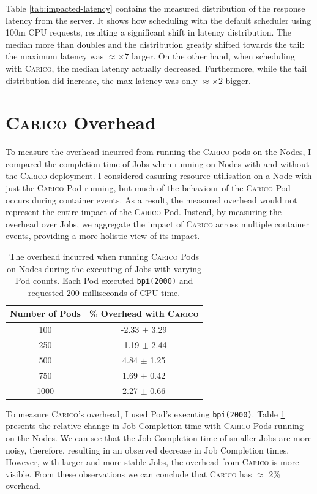 Table \ref{tab:impacted-latency} contains the measured distribution of the
response latency from the server. It shows how scheduling with the default
scheduler using 100m CPU requests, resulting a significant shift in latency
distribution. The median more than doubles and the distribution greatly shifted
towards the tail: the maximum latency was $\approx \times7$ larger. On the other
hand, when scheduling with \textsc{Carico}, the median latency actually decreased.
Furthermore, while the tail distribution did increase, the max latency was only
$\approx \times2$ bigger.

\section{\textsc{Carico} Overhead}
\label{sec:eval-overhead}
To measure the overhead incurred from running the \textsc{Carico} pods on the Nodes, I
compared the completion time of Jobs when running on Nodes with and without the
\textsc{Carico} deployment. I considered easuring resource utilisation on a Node with
just the \textsc{Carico} Pod running, but much of the behaviour of the
\textsc{Carico} Pod occurs during container events. As a result, the measured overhead
would not represent the entire impact of the \textsc{Carico} Pod. Instead, by measuring
the overhead over Jobs, we aggregate the impact of \textsc{Carico} across multiple
container events, providing a more holistic view of its impact.

\begin{table}[ht!]
\centering
    \begin{tabular}{|c|c|}
    \hline
    \textbf{Number of Pods} & \textbf{\% Overhead with \textsc{Carico}} \\
    \hline
        100 & -2.33 $\pm$ 3.29 \\
        250 & -1.19 $\pm$ 2.44 \\
        500 & 4.84  $\pm$ 1.25 \\
        750 & 1.69  $\pm$ 0.42 \\
        1000 & 2.27  $\pm$ 0.66 \\
    \hline
    \end{tabular}
    \label{tab:overhead}
    \caption{The overhead incurred when running \textsc{Carico} Pods on Nodes during the
    executing of Jobs with varying Pod counts. Each Pod executed
    \texttt{bpi(2000)} and requested 200 milliseconds of CPU time.}
\end{table}

To measure \textsc{Carico}'s overhead, I used Pod's executing \texttt{bpi(2000)}. Table
\ref{tab:overhead} presents the relative change in Job Completion time with
\textsc{Carico} Pods running on the Nodes. We can see that the Job Completion time of
smaller Jobs are more noisy, therefore, resulting in an observed decrease in Job
Completion times. However, with larger and more stable Jobs, the overhead from
\textsc{Carico} is more visible. From these observations we can conclude that \textsc{Carico} has
$\approx$ 2\% overhead.

